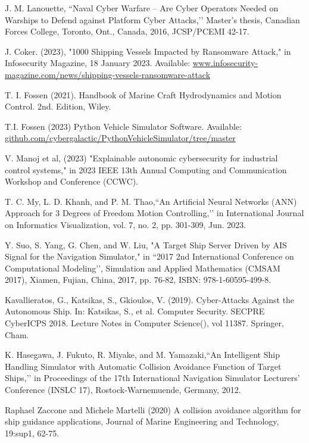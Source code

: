 \documentclass[conference]{IEEEtran}
\begin{document}
\begin{thebibliography}{00}
 J. M. Lanouette, ``Naval Cyber Warfare -- Are Cyber Operators Needed on Warships to Defend against Platform Cyber Attacks,’’ Master's thesis, Canadian Forces College, Toronto, Ont., Canada, 2016, JCSP/PCEMI 42-17.

 J. Coker. (2023), "1000 Shipping Vessels Impacted by Ransomware Attack," in Infosecurity Magazine, 18 January 2023. Available: \url{www.infosecurity-magazine.com/news/shipping-vessels-ransomware-attack}

 T. I. Fossen (2021). Handbook of Marine Craft Hydrodynamics and Motion Control. 2nd. Edition, Wiley.

 T.I. Fossen (2023) Python Vehicle Simulator Software. Available: \url{github.com/cybergalactic/PythonVehicleSimulator/tree/master}

 V. Manoj et al, (2023) "Explainable autonomic cybersecurity for industrial control systems," in 2023 IEEE 13th Annual Computing and Communication Workshop and Conference (CCWC).

 T. C. My, L. D. Khanh, and P. M. Thao,``An Artificial Neural Networks (ANN) Approach for 3 Degrees of Freedom Motion Controlling,’’ in International Journal on Informatics Visualization, vol. 7, no. 2, pp. 301-309, Jun. 2023.

 Y. Suo, S. Yang, G. Chen, and W. Liu, "A Target Ship Server Driven by AIS Signal for the Navigation Simulator," in ``2017 2nd International Conference on Computational Modeling’’, Simulation and Applied Mathematics (CMSAM 2017), Xiamen, Fujian, China, 2017, pp. 76-82, ISBN: 978-1-60595-499-8.

 Kavallieratos, G., Katsikas, S., Gkioulos, V. (2019). Cyber-Attacks Against the Autonomous Ship. In: Katsikas, S., et al. Computer Security. SECPRE CyberICPS 2018. Lecture Notes in Computer Science(), vol 11387. Springer, Cham.

 K. Hasegawa, J. Fukuto, R. Miyake, and M. Yamazaki,``An Intelligent Ship Handling Simulator with Automatic Collision Avoidance Function of Target Ships,’’ in Proceedings of the 17th International Navigation Simulator Lecturers’ Conference (INSLC 17), Rostock-Warnemuende, Germany, 2012.

 Raphael Zaccone and Michele Martelli (2020) A collision avoidance algorithm for ship guidance applications, Journal of Marine Engineering and Technology, 19:sup1, 62-75. 


\end{thebibliography}
\end{document}

